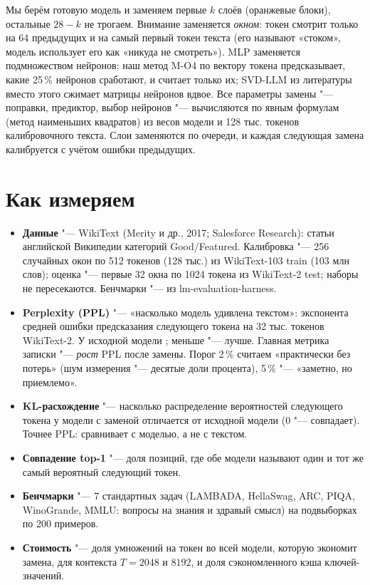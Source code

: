 \documentclass[10pt,a4paper]{article}
\begin{document}
Мы берём готовую модель и заменяем первые $k$ слоёв (оранжевые блоки), остальные
$28-k$ не трогаем. Внимание заменяется \emph{окном}: токен смотрит только на
64 предыдущих и на самый первый токен текста (его называют «стоком», модель
использует его как «никуда не смотреть»). MLP заменяется подмножеством нейронов:
наш метод M-O4 по вектору токена предсказывает, какие 25\,\% нейронов сработают,
и считает только их; SVD-LLM из литературы вместо этого сжимает матрицы
нейронов вдвое. Все параметры замены "--- поправки, предиктор, выбор нейронов "---
вычисляются по явным формулам (метод наименьших квадратов) из весов модели и
128 тыс. токенов калибровочного текста. Слои заменяются по очереди, и каждая
следующая замена калибруется с учётом ошибки предыдущих.

\section*{Как измеряем}

\begin{itemize}
  \item \textbf{Данные} "--- WikiText (Merity и др., 2017; Salesforce Research): статьи
    английской Википедии категорий Good/Featured. Калибровка "--- 256 случайных окон по 512
    токенов (128 тыс.) из WikiText-103 train (103 млн слов); оценка "--- первые 32 окна по 1024
    токена из WikiText-2 test; наборы не пересекаются. Бенчмарки "--- из lm-evaluation-harness.
  \item \textbf{Perplexity (PPL)} "--- «насколько модель удивлена текстом»:
    экспонента средней ошибки предсказания следующего токена на 32 тыс. токенов
    WikiText-2. У исходной модели \BasePPL; меньше "--- лучше. Главная метрика
    записки "--- \emph{рост} PPL после замены. Порог 2\,\% считаем «практически
    без потерь» (шум измерения "--- десятые доли процента), 5\,\% "--- «заметно, но приемлемо».
  \item \textbf{KL-расхождение} "--- насколько распределение вероятностей
    следующего токена у модели с заменой отличается от исходной модели
    ($0$ "--- совпадает). Точнее PPL: сравнивает с моделью, а не с текстом.
  \item \textbf{Совпадение top-1} "--- доля позиций, где обе модели называют один
    и тот же самый вероятный следующий токен.
  \item \textbf{Бенчмарки} "--- 7 стандартных задач (LAMBADA, HellaSwag, ARC,
    PIQA, WinoGrande, MMLU: вопросы на знания и здравый смысл) на подвыборках по
    200 примеров.
  \item \textbf{Стоимость} "--- доля умножений на токен во всей модели,
    которую экономит замена, для контекста $T=2048$ и $8192$, и доля
    сэкономленного кэша ключей-значений.
\end{itemize}
\end{document}
